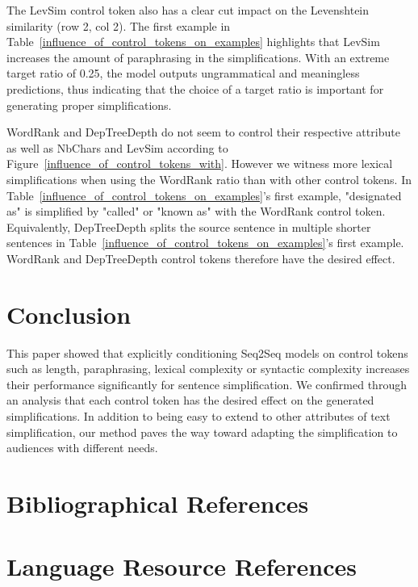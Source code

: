 \documentclass[10pt, a4paper]{article}
\begin{document}
The LevSim control token also has a clear cut impact on the Levenshtein similarity (row 2, col 2).
The first example in Table~\ref{influence_of_control_tokens_on_examples} highlights that LevSim increases the amount of paraphrasing in the simplifications. With an extreme target ratio of 0.25, the model outputs ungrammatical and meaningless predictions, thus indicating that the choice of a target ratio is important for generating proper simplifications.

WordRank and DepTreeDepth do not seem to control their respective attribute as well as NbChars and LevSim according to Figure~\ref{influence_of_control_tokens_with}.
However we witness more lexical simplifications when using the WordRank ratio than with other control tokens. In Table~\ref{influence_of_control_tokens_on_examples}'s first example, "designated as" is simplified by "called" or "known as" with the WordRank control token.
Equivalently, DepTreeDepth splits the source sentence in multiple shorter sentences in Table~\ref{influence_of_control_tokens_on_examples}'s first example.
WordRank and DepTreeDepth control tokens therefore have the desired effect.



\section{Conclusion}
This paper showed that explicitly conditioning Seq2Seq models on control tokens such as length, paraphrasing, lexical complexity or syntactic complexity increases their performance significantly for sentence simplification. We confirmed through an analysis that each control token has the desired effect on the generated simplifications.
In addition to being easy to extend to other attributes of text simplification, our method paves the way toward adapting the simplification to audiences with different needs. 

\section{Bibliographical References}
\label{main:ref}



\section{Language Resource References}
\label{lr:ref}
\end{document}
